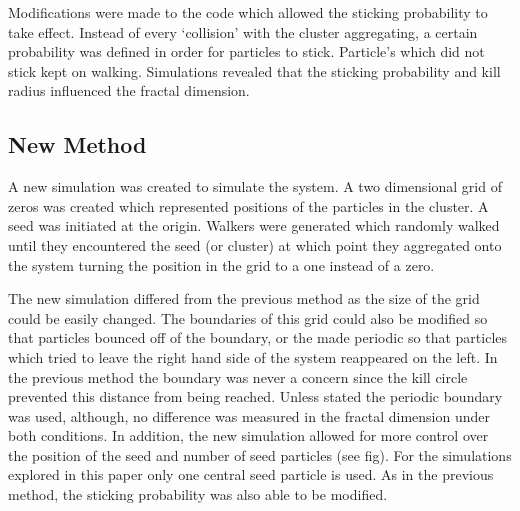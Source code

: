 \documentclass[%
 aapm,
 mph,%
 amsmath,amssymb,
 reprint,%
]{revtex4-2}
\begin{document}
Modifications were made to the code which allowed the sticking probability to take effect. Instead of every `collision' with the cluster aggregating, a certain probability was defined in order for particles to stick. Particle's which did not stick kept on walking. Simulations revealed that the sticking probability and kill radius influenced the fractal dimension.
\subsection{\label{sec:new_code}New Method}
A new simulation was created to simulate the system. A two dimensional grid of zeros was created which represented positions of the particles in the cluster. A seed was initiated at the origin. Walkers were generated which randomly walked until they encountered the seed (or cluster) at which point they aggregated onto the system turning the position in the grid to a one instead of a zero.

The new simulation differed from the previous method as the size of the grid could be easily changed. The boundaries of this grid could also be modified so that particles bounced off of the boundary, or the made periodic so that particles which tried to leave the right hand side of the system reappeared on the left. In the previous method the boundary was never a concern since the kill circle prevented this distance from being reached. Unless stated the periodic boundary was used, although, no difference was measured in the fractal dimension under both conditions. In addition, the new simulation allowed for more control over the position of the seed and number of seed particles (see fig). For the simulations explored in this paper only one central seed particle is used. As in the previous method, the sticking probability was also able to be modified.
\end{document}

